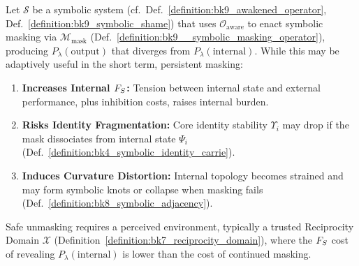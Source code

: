 \begin{proposition}
\label{proposition:bk9_costs_and_consequences_of_masking}
Let $\mathcal{S}$ be a symbolic system
(cf.~Def.~\ref{definition:bk9_awakened_operator},
Def.~\ref{definition:bk9_symbolic_shame}) that uses
$\mathcal{O}_{\text{aware}}$ to enact symbolic masking via
$\mathcal{M}_{\text{mask}}$
(Def.~\ref{definition:bk9__symbolic_masking_operator}), producing
$P_\lambda(\text{output})$ that diverges from $P_\lambda(\text{internal})$.
While this may be adaptively useful in the short term, persistent masking:
\begin{enumerate}
    \item \textbf{Increases Internal $F_S$:} Tension between internal state and external performance, plus inhibition costs, raises internal burden.
    \item \textbf{Risks Identity Fragmentation:} Core identity stability $\Upsilon_i$ may drop if the mask dissociates from internal state $\Psi_i$ (Def.~\ref{definition:bk4_symbolic_identity_carrie}).
    \item \textbf{Induces Curvature Distortion:} Internal topology becomes strained and may form symbolic knots or collapse when masking fails (Def.~\ref{definition:bk8_symbolic_adjacency}).
\end{enumerate}
Safe unmasking requires a perceived environment, typically a trusted Reciprocity Domain $\mathcal{X}$ (Definition~\ref{definition:bk7_reciprocity_domain}), where the $F_S$ cost of revealing $P_\lambda(\text{internal})$ is lower than the cost of continued masking.
\end{proposition}

